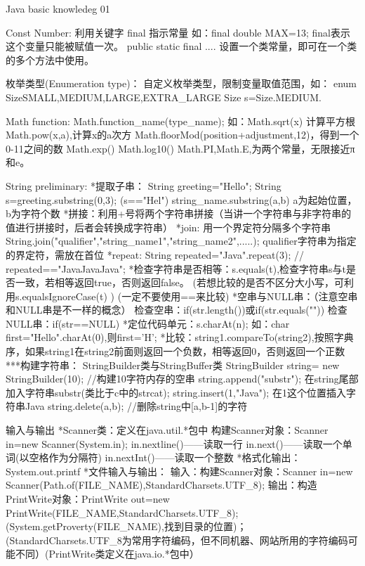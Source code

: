 Java basic knowledeg 
01

Const Number:
   利用关键字 final 指示常量
   如：final double MAX=13; final表示这个变量只能被赋值一次。
   public static final .... 设置一个类常量，即可在一个类的多个方法中使用。

枚举类型(Enumeration type)：
    自定义枚举类型，限制变量取值范围，如：
    enum Size{SMALL,MEDIUM,LARGE,EXTRA_LARGE}
    Size s=Size.MEDIUM.

Math function:
Math.function_name(type_name);
如：Math.sqrt(x) 计算平方根
    Math.pow(x,a),计算x的a次方
    Math.floorMod(position+adjustment,12)，得到一个0-11之间的数
    Math.exp()
    Math.log10()
    Math.PI,Math.E,为两个常量，无限接近π和e。

String preliminary:
*提取子串： String greeting="Hello";
          String s=greeting.substring(0,3);
          (s=="Hel")
string_name.substring(a,b) a为起始位置，b为字符个数
*拼接：利用+号将两个字符串拼接（当讲一个字符串与非字符串的值进行拼接时，后者会转换成字符串）
*join: 用一个界定符分隔多个字符串  String.join("qualifier","string_name1","string_name2",.....);
                                               qualifier字符串为指定的界定符，需放在首位
*repeat: String repeated="Java".repeat(3); // repeated=="JavaJavaJava";
*检查字符串是否相等：s.equals(t),检查字符串s与t是否一致，若相等返回true，否则返回false。
 (若想比较的是否不区分大小写，可利用s.equalsIgnoreCase(t) )  
 (一定不要使用==来比较)
*空串与NULL串：（注意空串和NULL串是不一样的概念）
 检查空串：if(str.length())或if(str.equals(""))
 检查NULL串：if(str==NULL)
*定位代码单元：s.charAt(n); 如：char first="Hello".charAt(0),则first='H';
*比较：string1.compareTo(string2),按照字典序，如果string1在string2前面则返回一个负数，相等返回0，否则返回一个正数
***构建字符串：
   StringBuilder类与StringBuffer类
   StringBuilder string= new StringBuilder(10); //构建10字符内存的空串
   string.append("substr"); 在string尾部加入字符串substr(类比于c中的strcat);
   string.insert(1,"Java"); 在1这个位置插入字符串Java
   string.delete(a,b); //删除string中[a,b-1]的字符

输入与输出
*Scanner类：定义在java.util.*包中
    构建Scanner对象：Scanner in=new Scanner(System.in);
    in.nextline()——读取一行
    in.next()——读取一个单词(以空格作为分隔符)
    in.nextInt()——读取一个整数
*格式化输出：System.out.printf
*文件输入与输出：
    输入：构建Scanner对象：Scanner in=new Scanner(Path.of(FILE_NAME),StandardCharsets.UTF_8);
    输出：构造PrintWrite对象：PrintWrite out=new PrintWrite(FILE_NAME,StandardCharsets.UTF_8);
    (System.getProverty(FILE_NAME),找到目录的位置)；(StandardCharsets.UTF_8为常用字符编码，但不同机器、网站所用的字符编码可能不同）(PrintWrite类定义在java.io.*包中）

